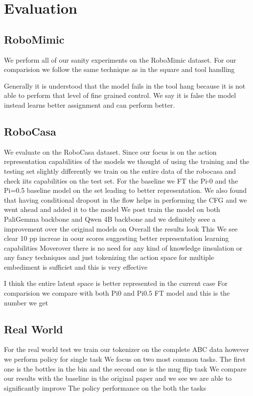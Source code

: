 \section{Evaluation}

\subsection{RoboMimic}

We perform all of our sanity experiments on the RoboMimic dataset. 
For our comparision we follow the same technique as in the square and tool handling

Generally it is understood that the model fails in the tool hang because it is not able to 
perform that level of fine grained control. We say it is false the model instead learns better 
assignment and can perform better. 

\subsection{RoboCasa}

We evaluate on the RoboCasa dataset. Since our focus is on the action representation capabilities of the models
we thought of using the training and the testing set slightly differently we train on the entire data of the 
robocasa and check iits capabilities on the test set. For the baseline we FT the Pi-0 and the Pi=0.5 baseline 
model on the set leading to better representation. We also found that having conditional dropout in the flow helps 
in performing the CFG and we went ahead and added it to the model 
We post train the model on both PaliGemma backbone and Qwen 4B backbone and we definitely seee a improvement over
the original models on 
Overall the results look This
We see clear 10 pp increae in oour scores suggesting better representation learning capabilities
Moverover there is no need for any kind of knowledge iinsulation or any fancy techniques and 
just tokenizing the action space for multiple embediment is sufficiet and this is very effective

I think the entire latent space is better represented in the current case 
For comparision we compare with both Pi0 and Pi0.5 FT model and this is the number we get 





\subsection{Real World}
For the real world test we train our tokenizer on the complete ABC data however we perform policy for single task
We focus on two most common tasks. The first one is the bottles in the bin and the second one is the mug flip task
We compare our results with the baseline in the original paper and we see we are able to significantly improve The
policy performance on the both the tasks

